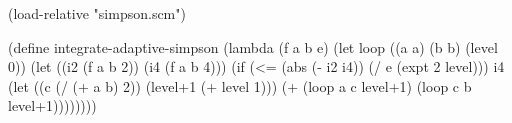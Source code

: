 (load-relative "simpson.scm")

(define integrate-adaptive-simpson
  (lambda (f a b e)
    (let loop ((a a) (b b) (level 0))
      (let ((i2 (f a b 2))
            (i4 (f a b 4)))
        (if (<= (abs (- i2 i4)) (/ e (expt 2 level)))
            i4
            (let ((c (/ (+ a b) 2))
                  (level+1 (+ level 1)))
              (+ (loop a c level+1) 
                 (loop c b level+1)))))))) 


